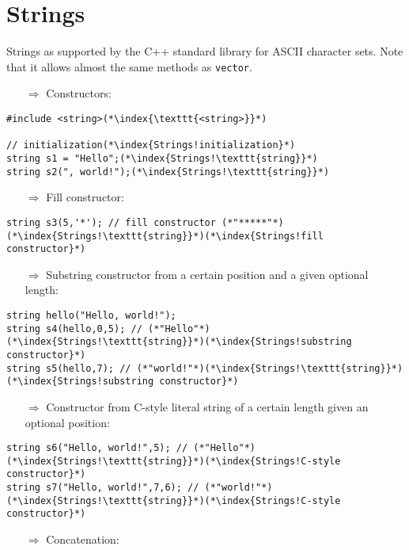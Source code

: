 \documentclass[10pt]{book}
\begin{document}
\section{Strings}
Strings as supported by the C++ standard library for ASCII character sets. Note that it allows almost the same methods as \texttt{vector}.
\begin{enumerate}
\item[$\Rightarrow$] Constructors:
\end{enumerate}
\begin{lstlisting}
#include <string>(*\index{\texttt{<string>}}*)

// initialization(*\index{Strings!initialization}*)
string s1 = "Hello";(*\index{Strings!\texttt{string}}*)
string s2(", world!");(*\index{Strings!\texttt{string}}*)
\end{lstlisting}
\begin{enumerate}
\item[$\Rightarrow$] Fill constructor:
\end{enumerate}
\begin{lstlisting}
string s3(5,'*'); // fill constructor (*"*****"*)(*\index{Strings!\texttt{string}}*)(*\index{Strings!fill constructor}*)
\end{lstlisting}
\begin{enumerate}
\item[$\Rightarrow$] Substring constructor from a certain position and a given optional length:
\end{enumerate}
\begin{lstlisting}
string hello("Hello, world!");
string s4(hello,0,5); // (*"Hello"*)(*\index{Strings!\texttt{string}}*)(*\index{Strings!substring constructor}*)
string s5(hello,7); // (*"world!"*)(*\index{Strings!\texttt{string}}*)(*\index{Strings!substring constructor}*)
\end{lstlisting}
\begin{enumerate}
\item[$\Rightarrow$] Constructor from C-style literal string of a certain length given an optional position:
\end{enumerate}
\begin{lstlisting}
string s6("Hello, world!",5); // (*"Hello"*)(*\index{Strings!\texttt{string}}*)(*\index{Strings!C-style constructor}*)
string s7("Hello, world!",7,6); // (*"world!"*)(*\index{Strings!\texttt{string}}*)(*\index{Strings!C-style constructor}*)
\end{lstlisting}
\begin{enumerate}
\item[$\Rightarrow$] Concatenation:
\end{enumerate}
\end{document}
